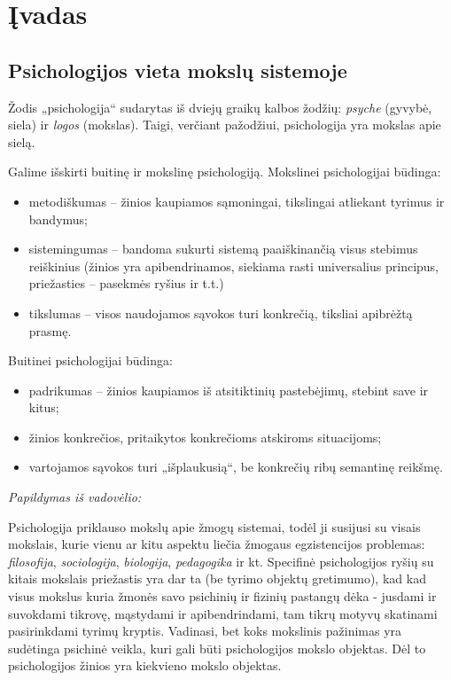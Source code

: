 \chapter{Įvadas}

\section{Psichologijos vieta mokslų sistemoje}

\label{tema:psichologijos_mokslas}

Žodis „psichologija“ sudarytas iš dviejų graikų kalbos žodžių: 
\emph{psyche} (gyvybė, siela) ir \emph{logos} (mokslas). Taigi, verčiant
pažodžiui, psichologija yra mokslas apie sielą.

Galime išskirti buitinę ir mokslinę psichologiją. Mokslinei psichologijai
būdinga:
\begin{itemize}
  \item metodiškumas – žinios kaupiamos sąmoningai, tikslingai atliekant
    tyrimus ir bandymus;
  \item sistemingumas – bandoma sukurti sistemą paaiškinančią visus 
    stebimus reiškinius (žinios yra apibendrinamos, siekiama rasti 
    universalius principus, priežasties – pasekmės ryšius ir t.t.)
  \item tikslumas – visos naudojamos sąvokos turi konkrečią, tiksliai
    apibrėžtą prasmę.
\end{itemize}
Buitinei psichologijai būdinga:
\begin{itemize}
  \item padrikumas – žinios kaupiamos iš atsitiktinių pastebėjimų, 
    stebint save ir kitus;
  \item žinios konkrečios, pritaikytos konkrečioms atskiroms situacijoms;
  \item vartojamos sąvokos turi „išplaukusią“, be konkrečių ribų 
    semantinę reikšmę.
\end{itemize}

\emph{Papildymas iš vadovėlio:}

Psichologija priklauso mokslų apie žmogų sistemai, todėl ji susijusi su
visais mokslais, kurie vienu ar kitu aspektu liečia žmogaus egzistencijos 
problemas: \emph{filosofija}, \emph{sociologija}, \emph{biologija},
\emph{pedagogika} ir kt. Specifinė psichologijos ryšių su kitais mokslais
priežastis yra dar ta (be tyrimo objektų gretimumo), kad kad visus mokslus
kuria žmonės savo psichinių ir fizinių pastangų dėka - jusdami ir suvokdami
tikrovę, mąstydami ir apibendrindami, tam tikrų motyvų skatinami 
pasirinkdami tyrimų kryptis. Vadinasi, bet koks mokslinis pažinimas yra 
sudėtinga psichinė veikla, kuri gali būti psichologijos mokslo objektas.
Dėl to psichologijos žinios yra kiekvieno mokslo objektas.

